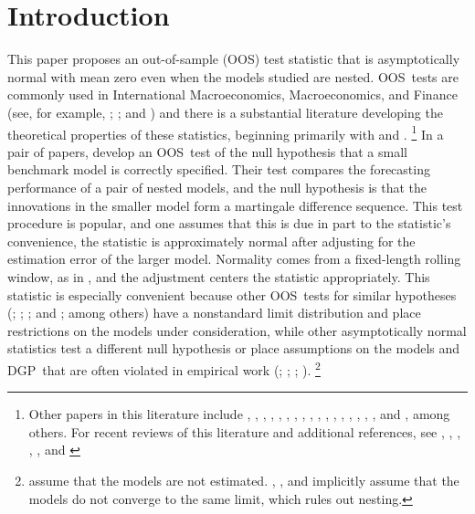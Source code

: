\documentclass[12pt,fleqn]{article}
\theoremstyle{definition}
\newcommand{\dgp}{DGP}
\newcommand{\oos}{OOS}
\begin{document}
\section{Introduction} This paper proposes an out-of-sample (\oos)
test statistic that is asymptotically normal with mean zero even when
the models studied are nested.
\oos\ tests are commonly used in International Macroeconomics,
Macroeconomics, and Finance (see, for example, \citealt{MeR:83};
\citealt{StW:03}; and \citealt{GoW:08}) and there is a substantial
literature developing the theoretical properties of these statistics,
beginning primarily with \citet{DiM:95} and
\citet{Wes:96}.%
\footnote{Other papers in this literature include
  \citet{WeM:98}, \citet{Mcc:98,Mcc:00},
  \citet{ClM:01,ClM:05-2,ClM:05,ClM:11b,ClM:12,ClM:12b},
  \citet{CCS:01}, \citet{CoS:02,CoS:04,CoS:07}, \citet{Whi:00},
  \citet{InK:04,InK:06}, \citet{Han:05}, \citet{Ros:05},
  \citet{ClW:06,ClW:07}, \citet{Ana:07}, \citet{GiR:09,GiR:10},
  \citet{HuW:10}, \citet{HLN:11}, \cite{InR:11}, \cite{Pin:11},
  \cite{RoS:11,RoS:11b}, and \citet{Cal:11}, among others.  For recent
  reviews of this literature and additional references, see
  \citet{McW:02}, \citet{CoS:06}, \citet{Wes:06}, \citet{ClM:11c},
  \citet{CoD:11}, and \citet{Gia:11}} %
In a pair of papers,
\citet{ClW:06,ClW:07} develop an \oos\ test of the null hypothesis
that a small benchmark model is correctly specified.  Their test
compares the forecasting performance of a pair of nested models, and
the null hypothesis is that the innovations in the smaller model form
a martingale difference sequence.  This test procedure is popular, and
one assumes that this is due in part to the statistic's convenience,
the statistic is approximately normal after adjusting for the
estimation error of the larger model.  Normality comes from a
fixed-length rolling window, as in \citet{GiW:06}, and the adjustment
centers the statistic appropriately.  This statistic is especially
convenient because other \oos\ tests for similar hypotheses
(\citealt{CCS:01}; \citealt{ClM:01,ClM:05}; \citealt{CoS:02,CoS:04};
and \citealt{Mcc:07}; among others) have a nonstandard limit
distribution and place restrictions on the models under consideration,
while other asymptotically normal statistics test a different null
hypothesis \citep{GiW:06} or place assumptions on the models and \dgp\
that are often violated in empirical work (\citealt{DiM:95};
\citealt{Wes:96}; \citealt{WeM:98};
\citealt{Mcc:00}).%
\footnote{\citet{DiM:95} assume that the models are
  not estimated. \citet{Wes:96}, \citet{WeM:98}, and \citet{Mcc:00}
  implicitly assume that the models do not converge to the same limit,
  which rules out nesting.} %
\end{document}
